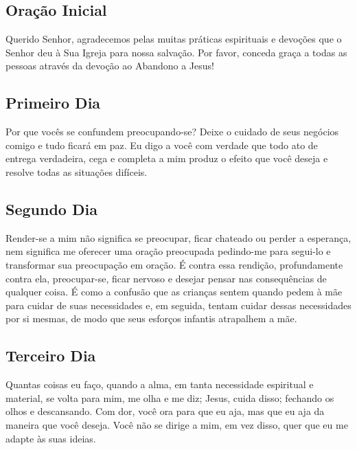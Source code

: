 \documentclass[18pt]{article}
\begin{document}
\subsection{Oração Inicial}\label{sec:Oração_Inicial} %

Querido Senhor, agradecemos pelas muitas práticas espirituais e devoções que o Senhor deu à Sua Igreja para nossa salvação. Por favor, conceda graça a todas as pessoas através da devoção ao Abandono a Jesus!

\subsection{Primeiro Dia}
\textbf{}

Por que vocês se confundem preocupando-se? Deixe o cuidado de seus negócios comigo e tudo ficará em paz. Eu digo a você com verdade que todo ato de entrega verdadeira, cega e completa a mim produz o efeito que você deseja e resolve todas as situações difíceis.

\textbf{}

\subsection{Segundo Dia}
\textbf{}

Render-se a mim não significa se preocupar, ficar chateado ou perder a esperança, nem significa me oferecer uma oração preocupada pedindo-me para segui-lo e transformar sua preocupação em oração. É contra essa rendição, profundamente contra ela, preocupar-se, ficar nervoso e desejar pensar nas consequências de qualquer coisa. É como a confusão que as crianças sentem quando pedem à mãe para cuidar de suas necessidades e, em seguida, tentam cuidar dessas necessidades por si mesmas, de modo que seus esforços infantis atrapalhem a mãe.

\textbf{}

\subsection{Terceiro Dia}
\textbf{}

Quantas coisas eu faço, quando a alma, em tanta necessidade espiritual e material, se volta para mim, me olha e me diz; Jesus, cuida disso; fechando os olhos e descansando. Com dor, você ora para que eu aja, mas que eu aja da maneira que você deseja. Você não se dirige a mim, em vez disso, quer que eu me adapte às suas ideias.
\end{document}
